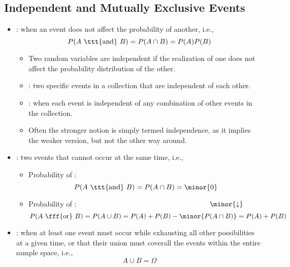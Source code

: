 \begin{itemize}
  \subsection{Independent and Mutually Exclusive Events}
  \begin{itemize}
    \item {}: when an event does not affect the probability of another, i.e.,
    \[%
    P(A~\ttt{\text{and}}~B)=P(A\cap B)=P(A)P(B)
    \]%
    \begin{itemize}
      \item Two random variables are independent if the realization of one does not affect the probability distribution of the other.
      \item {}: two specific events in a collection that are independent of each other.
      \item {}: when each event is independent of any combination of other events in the collection.
      \item Often the stronger notion is simply termed independence, as it implies the weaker version, but not the other way around.
    \end{itemize}
    \item {}: two events that cannot occur at the same time, i.e., 
    \begin{itemize}
      \item Probability of :
      \[%
      P(A~\text{\ttt{and}}~B) = P(A\cap B)= \minor{0} 
      \]%
      \item Probability of : \(\hspace{182pt}\minor{\downarrow}\)
      \[%
      P(A~\fff{\text{or}}~B)=P(A\cup B)=  P(A)+P(B) - \minor{P(A\cap B)} = P(A)+P(B) 
      \]%
    \end{itemize}
    \item {}: when at least one event must occur while exhausting all other possibilities at a given time, or that their union must coverall the events within the entire sample space, i.e., 
    \[%
    A\cup B = \Omega
    \]%
    

\end{itemize}
\end{itemize}
